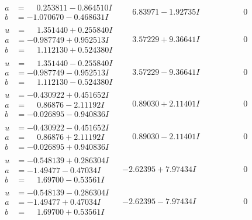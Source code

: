 \documentclass[1p]{elsarticle_modified}
\theoremstyle{definition}
\begin{document}
$$\begin{array}{c|c|c}
\begin{aligned}
a &= \phantom{-}0.253811 - 0.864510 I \\
b &= -1.070670 - 0.468631 I\end{aligned}
 & \phantom{-}6.83971 - 1.92735 I & \phantom{-0.000000 } 0 \\ \hline\begin{aligned}
u &= \phantom{-}1.351440 + 0.255840 I \\
a &= -0.987749 + 0.952513 I \\
b &= \phantom{-}1.112130 + 0.524380 I\end{aligned}
 & \phantom{-}3.57229 + 9.36641 I & \phantom{-0.000000 } 0 \\ \hline\begin{aligned}
u &= \phantom{-}1.351440 - 0.255840 I \\
a &= -0.987749 - 0.952513 I \\
b &= \phantom{-}1.112130 - 0.524380 I\end{aligned}
 & \phantom{-}3.57229 - 9.36641 I & \phantom{-0.000000 } 0 \\ \hline\begin{aligned}
u &= -0.430922 + 0.451652 I \\
a &= \phantom{-}0.86876 - 2.11192 I \\
b &= -0.026895 - 0.940836 I\end{aligned}
 & \phantom{-}0.89030 + 2.11401 I & \phantom{-0.000000 } 0 \\ \hline\begin{aligned}
u &= -0.430922 - 0.451652 I \\
a &= \phantom{-}0.86876 + 2.11192 I \\
b &= -0.026895 + 0.940836 I\end{aligned}
 & \phantom{-}0.89030 - 2.11401 I & \phantom{-0.000000 } 0 \\ \hline\begin{aligned}
u &= -0.548139 + 0.286304 I \\
a &= -1.49477 - 0.47034 I \\
b &= \phantom{-}1.69700 - 0.53561 I\end{aligned}
 & -2.62395 + 7.97434 I & \phantom{-0.000000 } 0 \\ \hline\begin{aligned}
u &= -0.548139 - 0.286304 I \\
a &= -1.49477 + 0.47034 I \\
b &= \phantom{-}1.69700 + 0.53561 I\end{aligned}
 & -2.62395 - 7.97434 I & \phantom{-0.000000 } 0\\

\end{array}$$
\end{document}

